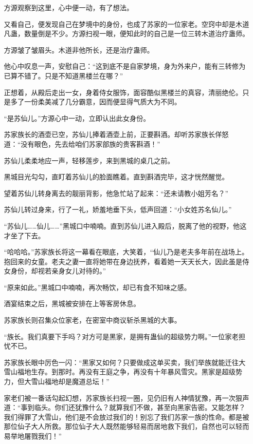 \begin{this_body}
方源观察到这里，心中便一动，有了想法。

又看自己，便发现自己在梦境中的身份，也成了苏家的一位家老。空窍中却是木道凡蛊，数量倒是不少。方源扫视一眼，便知此时的自己是一位三转木道治疗蛊师。

方源皱了皱眉头。木道非他所长，还是治疗蛊师。

他心中叹息一声，安慰自己：“这到底不是自家梦境，身为外来户，能有三转修为已算不错了。只是不知道黑楼兰在哪？”

正想着，从殿后走出一女，身着侍女服饰，面容酷似黑楼兰的真容，清丽绝伦。只是多了一份柔美减了几分霸意，因而便显得气质大为不同。

“是苏仙儿。”方源心中一动，立即认出此女身份。

苏家族长的酒壶已空，苏仙儿捧着酒壶上前，正要斟酒。却听苏家族长佯怒道：“没有眼色，先去给咱们苏家部族的贵客斟酒！”

苏仙儿柔柔地应一声，轻移莲步，来到黑城的桌几之前。

黑城目光勾勾，直盯着苏仙儿的脸面瞧着。直到斟酒完毕，这才恍然醒觉。

望着苏仙儿转身离去的靓丽背影，他急忙站了起来：“还未请教小姐芳名？”

苏仙儿转过身来，行了一礼，娇羞地垂下头，低声回道：“小女姓苏名仙儿。”

“苏仙儿……仙儿……”黑城口中喃喃。直到苏仙儿进入殿后，脱离了他的视野，他这才坐了下去。

“哈哈哈。”苏家族长将这一幕看在眼底，大笑着，“仙儿乃是老夫多年前在战场上。抱回来的女童。老夫之妻一直将她带在身边抚养，看着她一天天长大，因此虽是侍女身份，却视若亲身女儿对待的。”

“原来如此。”黑城口中喃喃，再次畅饮，却已有食不知味之感。

酒宴结束之后，黑城被安排在上等客房休息。

苏家族长则召集众位家老，在密室中商议斩杀黑城的大事。

“族长。我们真要下手吗？对方可是黑家，是拥有蛊仙的超级势力啊。”一位家老担忧不已。

苏家族长眼中厉色一闪：“黑家又如何？只要做成这单买卖，我们举族就能迁往大雪山福地生存。到那时。再没有王庭之争，再没有十年暴风雪灾。黑家是超级势力，但大雪山福地却是魔道总坛！”

家老们被一番话勾起幻想，苏家族长扫视一圈，见仍旧有人神情犹豫，再一次狠声道：“事到临头。你们还犹豫什么？就算我们不做，甚至向黑家告密。又能怎样？我们得罪了大雪山，他们是不会放过我们的！别忘了我们苏家一族的性命。都是被那位仙子大人所救。那位仙子大人既然能够轻易而居地救下我们，自然也可以轻而易举地屠戮我们！”


\end{this_body}
